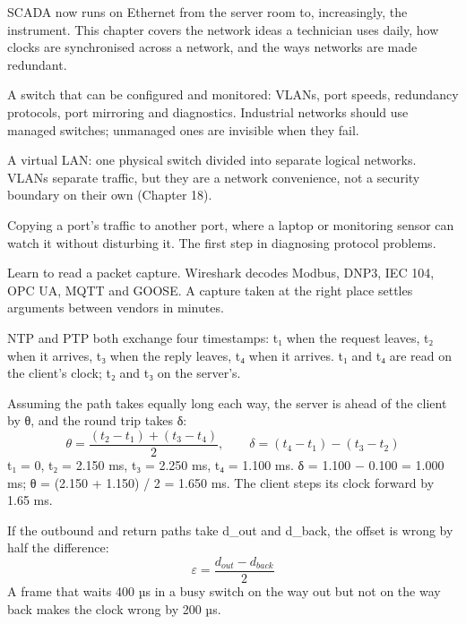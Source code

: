 SCADA now runs on Ethernet from the server room to, increasingly, the instrument. This chapter covers the network ideas a technician uses daily, how clocks are synchronised across a network, and the ways networks are made redundant.

 A switch that can be configured and monitored: VLANs, port speeds, redundancy protocols, port mirroring and diagnostics. Industrial networks should use managed switches; unmanaged ones are invisible when they fail.

 A virtual LAN: one physical switch divided into separate logical networks. VLANs separate traffic, but they are a network convenience, not a security boundary on their own (Chapter 18).

 Copying a port's traffic to another port, where a laptop or monitoring sensor can watch it without disturbing it. The first step in diagnosing protocol problems.

\onsite Learn to read a packet capture. Wireshark decodes Modbus, DNP3, IEC 104, OPC UA, MQTT and GOOSE. A capture taken at the right place settles arguments between vendors in minutes.

NTP and PTP both exchange four timestamps: t₁ when the request leaves, t₂ when it arrives, t₃ when the reply leaves, t₄ when it arrives. t₁ and t₄ are read on the client's clock; t₂ and t₃ on the server's.

 Assuming the path takes equally long each way, the server is ahead of the client by θ, and the round trip takes δ:
\[ \theta = \frac{(t_2 - t_1) + (t_3 - t_4)}{2}, \qquad \delta = (t_4 - t_1) - (t_3 - t_2) \]
 t₁ = 0, t₂ = 2.150 ms, t₃ = 2.250 ms, t₄ = 1.100 ms. δ = 1.100 − 0.100 = 1.000 ms; θ = (2.150 + 1.150) / 2 = 1.650 ms. The client steps its clock forward by 1.65 ms.

 If the outbound and return paths take d\_out and d\_back, the offset is wrong by half the difference:
\[ \varepsilon = \frac{d_{out} - d_{back}}{2} \]
A frame that waits 400 µs in a busy switch on the way out but not on the way back makes the clock wrong by 200 µs.

